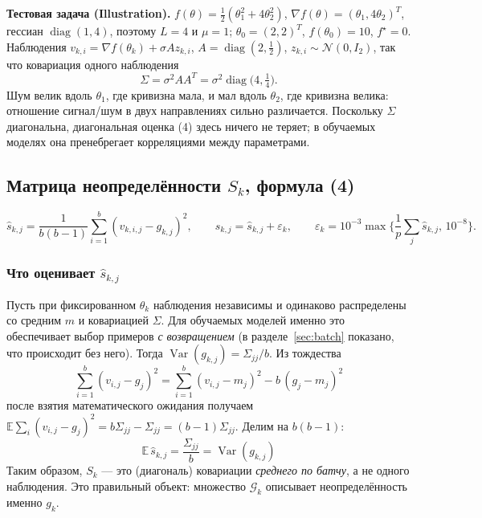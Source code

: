 \documentclass[11pt,a4paper]{article}
\newcommand{\G}{\mathcal{G}_k}
\newcommand{\E}{\mathbb{E}}
\DeclareMathOperator{\diag}{diag}
\DeclareMathOperator{\Var}{Var}
\begin{document}
\textbf{Тестовая задача (Illustration).}
$f(\theta)=\tfrac12(\theta_1^2+4\theta_2^2)$, $\nabla f(\theta)=(\theta_1,4\theta_2)^T$,
гессиан $\diag(1,4)$, поэтому $L=4$ и $\mu=1$; $\theta_0=(2,2)^T$, $f(\theta_0)=10$,
$f^\star=0$. Наблюдения $v_{k,i}=\nabla f(\theta_k)+\sigma Az_{k,i}$, $A=\diag(2,\tfrac12)$,
$z_{k,i}\sim\mathcal N(0,I_2)$, так что ковариация одного наблюдения
\begin{equation*}
\Sigma=\sigma^2AA^T=\sigma^2\diag\big(4,\tfrac14\big).
\end{equation*}
Шум велик вдоль $\theta_1$, где кривизна мала, и мал вдоль $\theta_2$, где кривизна
велика: отношение сигнал/шум в двух направлениях сильно различается. Поскольку
$\Sigma$ диагональна, диагональная оценка (4) здесь ничего не теряет; в обучаемых
моделях она пренебрегает корреляциями между параметрами.

\subsection{Матрица неопределённости $S_k$, формула (4)}\label{sec:S}

\begin{equation*}
\widehat s_{k,j}=\frac1{b(b-1)}\sum_{i=1}^b(v_{k,i,j}-g_{k,j})^2,\qquad
s_{k,j}=\widehat s_{k,j}+\varepsilon_k,\qquad
\varepsilon_k=10^{-3}\max\Big\{\frac1p\sum_j\widehat s_{k,j},\,10^{-8}\Big\}.
\end{equation*}

\subsubsection*{Что оценивает $\widehat s_{k,j}$}

Пусть при фиксированном $\theta_k$ наблюдения независимы и одинаково распределены со
средним $m$ и ковариацией $\Sigma$. Для обучаемых моделей именно это обеспечивает
выбор примеров \emph{с возвращением} (в разделе~\ref{sec:batch} показано, что происходит без него).
Тогда $\Var(g_{k,j})=\Sigma_{jj}/b$. Из тождества
\begin{equation*}
\sum_{i=1}^b(v_{i,j}-g_j)^2=\sum_{i=1}^b(v_{i,j}-m_j)^2-b\,(g_j-m_j)^2
\end{equation*}
после взятия математического ожидания получаем
$\E\sum_i(v_{i,j}-g_j)^2=b\Sigma_{jj}-\Sigma_{jj}=(b-1)\Sigma_{jj}$. Делим на $b(b-1)$:
\begin{equation*}
\boxed{\;\E\,\widehat s_{k,j}=\frac{\Sigma_{jj}}b=\Var(g_{k,j})\;}
\end{equation*}
Таким образом, $S_k$ — это (диагональ) ковариации \emph{среднего по батчу}, а не
одного наблюдения. Это правильный объект: множество $\G$ описывает неопределённость
именно $g_k$.
\end{document}
